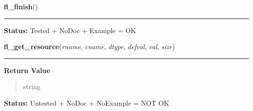     \label{xformslib:library:fl_finish}

    \vspace{0.5ex}

\hspace{.8\funcindent}\begin{boxedminipage}{\funcwidth}

    \raggedright \textbf{fl\_finish}()

    \vspace{-1.5ex}

    \rule{\textwidth}{0.5\fboxrule}
\setlength{\parskip}{2ex}
\setlength{\parskip}{1ex}
\textbf{Status:} Tested + NoDoc + Example = OK



    \end{boxedminipage}

    \label{xformslib:library:fl_get_resource}

    \vspace{0.5ex}

\hspace{.8\funcindent}\begin{boxedminipage}{\funcwidth}

    \raggedright \textbf{fl\_get\_resource}(\textit{rname}, \textit{cname}, \textit{dtype}, \textit{defval}, \textit{val}, \textit{size})

    \vspace{-1.5ex}

    \rule{\textwidth}{0.5\fboxrule}
\setlength{\parskip}{2ex}
\setlength{\parskip}{1ex}
      \textbf{Return Value}
    \vspace{-1ex}

      \begin{quote}
      string

      \end{quote}

\textbf{Status:} Untested + NoDoc + NoExample = NOT OK



    \end{boxedminipage}

    \label{xformslib:library:fl_set_resource}

